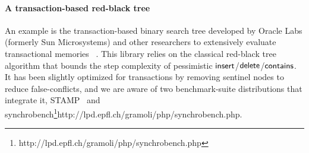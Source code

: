 \paragraph{A transaction-based red-black tree}
An example is the transaction-based binary search tree developed by Oracle Labs (formerly Sun Microsystems) and other researchers 
to extensively evaluate transactional memories~\cite{DSS06,HLMS03,CCKO08,HK08,FFR08,YNW+08,DFGG11} .
This library relies on the classical red-black tree algorithm that bounds the step complexity of pessimistic $\act{insert}$/$\act{delete}$/$\act{contains}$.
It has been slightly optimized for transactions by removing sentinel nodes to reduce false-conflicts, and we are aware of 
two benchmark-suite distributions that integrate it, STAMP~\cite{CCKO08} and synchrobench\footnote{http://lpd.epfl.ch/gramoli/php/synchrobench.php}{http://lpd.epfl.ch/gramoli/php/synchrobench.php}.


